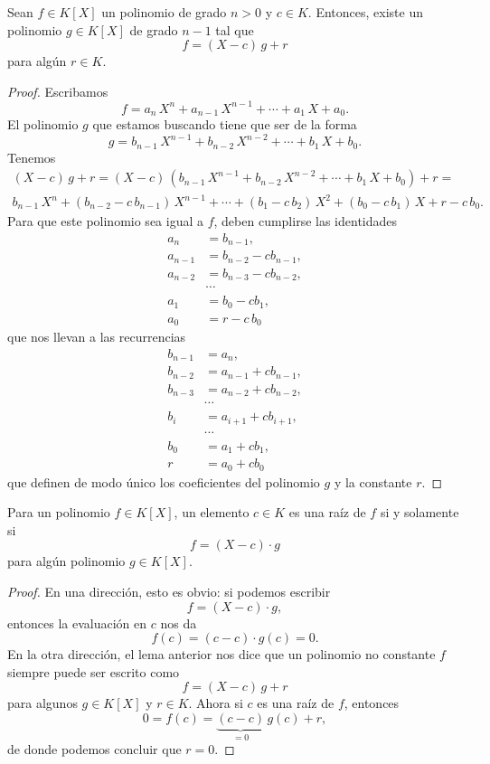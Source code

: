 \documentclass{article}
\theoremstyle{plain}
\begin{document}
\begin{lema}
  Sean $f \in K [X]$ un polinomio de grado $n > 0$ y $c \in K$. Entonces, existe
  un polinomio $g \in K [X]$ de grado $n-1$ tal que
  $$f = (X-c)\,g + r$$
  para algún $r \in K$.

  \begin{proof}
    Escribamos
    $$f = a_n\,X^n + a_{n-1}\,X^{n-1} + \cdots + a_1\,X + a_0.$$
    El polinomio $g$ que estamos buscando tiene que ser de la forma
    $$g = b_{n-1}\,X^{n-1} + b_{n-2}\,X^{n-2} + \cdots + b_1\,X + b_0.$$
    Tenemos
    \begin{multline*}
      (X-c)\,g + r = (X-c)\,(b_{n-1}\,X^{n-1} + b_{n-2}\,X^{n-2} + \cdots + b_1\,X + b_0) + r =\\
      b_{n-1}\,X^n + (b_{n-2} - c\,b_{n-1})\,X^{n-1} + \cdots
      + (b_1 - c\,b_2)\,X^2 + (b_0 - c\,b_1)\,X + r - c\,b_0.
\end{multline*}
Para que este polinomio sea igual a $f$, deben cumplirse las identidades
\begin{align*}
a_n & = b_{n-1},\\
a_{n-1} & = b_{n-2} - cb_{n-1},\\
a_{n-2} & = b_{n-3} - cb_{n-2},\\
 & \cdots \\
a_1 & = b_0 - cb_1,\\
a_0 & = r-c\,b_0
\end{align*}
que nos llevan a las recurrencias
\begin{align*}
b_{n-1} & = a_n,\\
b_{n-2} & = a_{n-1} + cb_{n-1},\\
b_{n-3} & = a_{n-2} + cb_{n-2},\\
 & \cdots \\
b_i & = a_{i+1} + cb_{i+1},\\
 & \cdots \\
b_0 & = a_1 + cb_1,\\
r & = a_0 + cb_0
\end{align*}
que definen de modo único los coeficientes del polinomio $g$ y la constante $r$.
\end{proof}
\end{lema}

\begin{proposicion}
  Para un polinomio $f\in K [X]$, un elemento $c \in K$ es una raíz de $f$ si y
  solamente si
  $$f = (X-c)\cdot g$$
  para algún polinomio $g\in K [X]$.

\begin{proof}
  En una dirección, esto es obvio: si podemos escribir
  $$f = (X-c)\cdot g,$$
  entonces la evaluación en $c$ nos da
  $$f (c) = (c-c)\cdot g (c) = 0.$$
  En la otra dirección, el lema anterior nos dice que un polinomio no constante
  $f$ siempre puede ser escrito como
  $$f = (X-c)\,g + r$$
  para algunos $g \in K [X]$ y $r \in K$. Ahora si $c$ es una raíz de $f$,
  entonces
  $$0 = f (c) = \underbrace{(c-c)}_{= 0}\,g (c) + r,$$
  de donde podemos concluir que $r = 0$.
\end{proof}
\end{proposicion}
\end{document}

